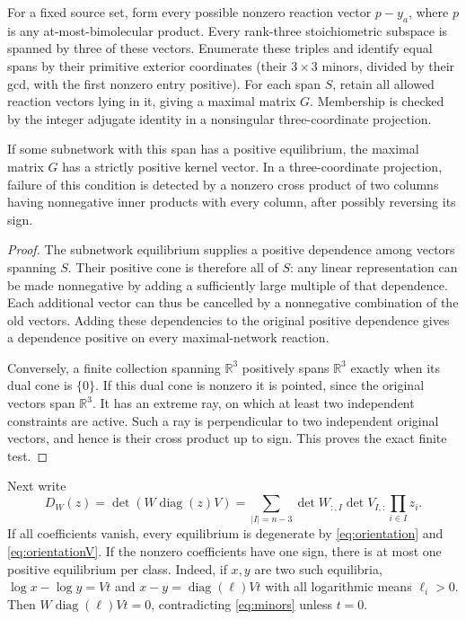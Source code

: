 \documentclass[11pt,a4paper]{report}
\providecommand{\R}{\mathbb{R}}
\providecommand{\diag}{\operatorname{diag}}
\begin{document}
For a fixed source set, form every possible nonzero reaction vector $p-y_a$, where $p$ is any
at-most-bimolecular product. Every rank-three stoichiometric subspace is spanned by three of these
vectors. Enumerate these triples and identify equal spans by their primitive exterior coordinates
(their $3\times3$ minors, divided by their gcd, with the first nonzero entry positive).
For each span $S$, retain all allowed reaction vectors lying in it, giving a maximal matrix $G$.
Membership is checked by the integer adjugate identity in a nonsingular three-coordinate projection.

\begin{lemma}\label{lem:maximal}
If some subnetwork with this span has a positive equilibrium, the maximal matrix $G$ has a strictly
positive kernel vector. In a three-coordinate projection, failure of this condition is detected by
a nonzero cross product of two columns having nonnegative inner products with every column,
after possibly reversing its sign.
\end{lemma}
\begin{proof}
The subnetwork equilibrium supplies a positive dependence among vectors spanning $S$. Their positive
cone is therefore all of $S$: any linear representation can be made nonnegative by adding a sufficiently
large multiple of that dependence. Each additional vector can thus be cancelled by a nonnegative
combination of the old vectors. Adding these dependencies to the original positive dependence gives
a dependence positive on every maximal-network reaction.

Conversely, a finite collection spanning $\R^3$ positively spans $\R^3$ exactly when its dual cone is
$\{0\}$. If this dual cone is nonzero it is pointed, since the original vectors span $\R^3$.
It has an extreme ray, on which at least two independent constraints are active. Such a ray is
perpendicular to two independent original vectors, and hence is their cross product up to sign.
This proves the exact finite test.
\end{proof}

Next write
\begin{equation}\label{eq:minors}
 D_W(z)=\det(W\diag(z)V)
       =\sum_{|I|=n-3}\det W_{:,I}\det V_{I,:}\prod_{i\in I}z_i.
\end{equation}
If all coefficients vanish, every equilibrium is degenerate by \eqref{eq:orientation} and
\eqref{eq:orientationV}. If the nonzero coefficients have one
sign, there is at most one positive equilibrium per class. Indeed, if $x,y$ are two such equilibria,
$\log x-\log y=Vt$ and $x-y=\diag(\ell)Vt$ with all logarithmic means $\ell_i>0$.
Then $W\diag(\ell)Vt=0$, contradicting \eqref{eq:minors} unless $t=0$.
\end{document}
